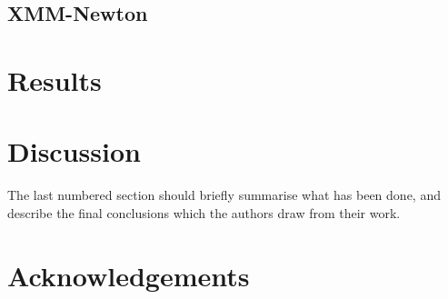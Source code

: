 \documentclass[fleqn,usenatbib]{mnras}
\begin{document}


\subsection{XMM-Newton}





\section{Results}

\section{Discussion}

The last numbered section should briefly summarise what has been done, and describe
the final conclusions which the authors draw from their work.

\section*{Acknowledgements}
\end{document}

